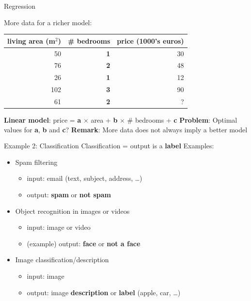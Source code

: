 \documentclass{beamer}
\begin{document}
\begin{frame}{Regression}

More data for a richer model:
\vfill
\begin{table}
\centering
\begin{tabular}{r|r|r}
living area (m$^2$) &  \textbf{\# bedrooms} & price (1000's euros) \\\hline
50 & \textbf{1} & 30\\
76 & \textbf{2} & 48\\
26 & \textbf{1} & 12\\
102 & \textbf{3} & 90\\
61 & \textbf{2} & ?
\end{tabular}
\end{table}

\vfill
\textbf{Linear model}: price = \textbf{a} $\times$ area + \textbf{b} $\times$ \# bedrooms + \textbf{c}
\vfill
\textbf{Problem}: Optimal values for \textbf{a}, \textbf{b} and \textbf{c}?
\vfill
\textbf{Remark}: More data does not always imply a better model
\end{frame}

\begin{frame}{Example 2: Classification}
\vfill
Classification = output is a \textbf{label}
\vfill
Examples: 
\pause
\vfill
\begin{itemize}
	\item Spam filtering
	\begin{itemize}
		\item input: email (text, subject, address, \ldots)
		\item output: \textbf{spam} or \textbf{not spam}
	\end{itemize}
\pause
\vfill
	\item Object recognition in images or videos
	\begin{itemize}
		\item input: image or video
		\item (example) output: \textbf{face} or \textbf{not a face}
	\end{itemize}
\pause
\vfill
	\item Image classification/description
	\begin{itemize}
		\item input: image
		\item output: image \textbf{description} or \textbf{label} (apple, car, \ldots)
	\end{itemize}
\end{itemize}
\vfill

\end{frame}
\end{document}
